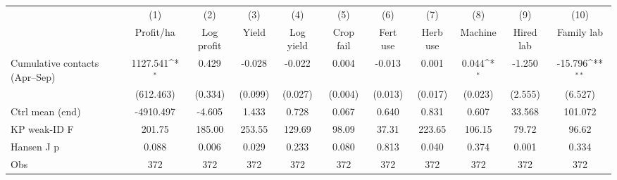 {
\def\sym#1{\ifmmode^{#1}\else\(^{#1}\)\fi}
\begin{tabular}{l*{10}{c}}
\toprule
                    &\multicolumn{1}{c}{(1)}&\multicolumn{1}{c}{(2)}&\multicolumn{1}{c}{(3)}&\multicolumn{1}{c}{(4)}&\multicolumn{1}{c}{(5)}&\multicolumn{1}{c}{(6)}&\multicolumn{1}{c}{(7)}&\multicolumn{1}{c}{(8)}&\multicolumn{1}{c}{(9)}&\multicolumn{1}{c}{(10)}\\
                    &\multicolumn{1}{c}{Profit/ha}&\multicolumn{1}{c}{Log profit}&\multicolumn{1}{c}{Yield}&\multicolumn{1}{c}{Log yield}&\multicolumn{1}{c}{Crop fail}&\multicolumn{1}{c}{Fert use}&\multicolumn{1}{c}{Herb use}&\multicolumn{1}{c}{Machine}&\multicolumn{1}{c}{Hired lab}&\multicolumn{1}{c}{Family lab}\\
\midrule
Cumulative contacts (Apr--Sep)&    1127.541\sym{*}  &       0.429         &      -0.028         &      -0.022         &       0.004         &      -0.013         &       0.001         &       0.044\sym{*}  &      -1.250         &     -15.796\sym{**} \\
                    &   (612.463)         &     (0.334)         &     (0.099)         &     (0.027)         &     (0.004)         &     (0.013)         &     (0.017)         &     (0.023)         &     (2.555)         &     (6.527)         \\
\midrule
Ctrl mean (end)     &   -4910.497         &      -4.605         &       1.433         &       0.728         &       0.067         &       0.640         &       0.831         &       0.607         &      33.568         &     101.072         \\
KP weak-ID F        &      201.75         &      185.00         &      253.55         &      129.69         &       98.09         &       37.31         &      223.65         &      106.15         &       79.72         &       96.62         \\
Hansen J p          &       0.088         &       0.006         &       0.029         &       0.233         &       0.080         &       0.813         &       0.040         &       0.374         &       0.001         &       0.334         \\
Obs                 &         372         &         372         &         372         &         372         &         372         &         372         &         372         &         372         &         372         &         372         \\
\bottomrule
\end{tabular}
}
